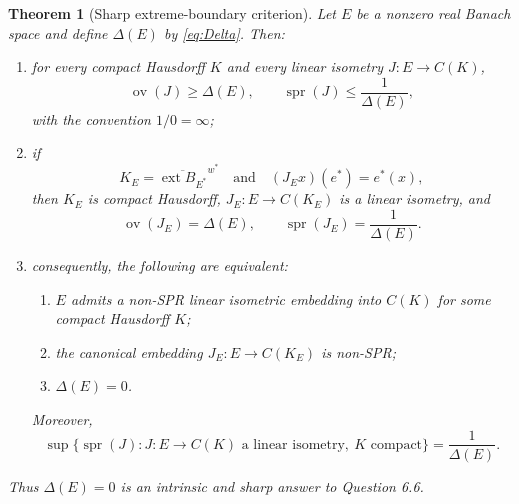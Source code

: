 \documentclass[11pt]{article}
\newtheorem{theorem}{Theorem}
\newcommand{\ext}{\operatorname{ext}}
\newcommand{\spr}{\operatorname{spr}}
\newcommand{\ov}{\operatorname{ov}}
\begin{document}
\begin{theorem}[Sharp extreme-boundary criterion]\label{thm:main}
Let $E$ be a nonzero real Banach space and define $\Delta(E)$ by
\eqref{eq:Delta}.  Then:
\begin{enumerate}[label=\textup{(\roman*)}]
\item for every compact Hausdorff $K$ and every linear isometry
$J:E\to C(K)$,
\[
 \ov(J)\geq\Delta(E),
 \qquad
 \spr(J)\leq\frac{1}{\Delta(E)},
\]
with the convention $1/0=\infty$;
\item if
\[
 K_E=\overline{\ext B_{E^*}}^{w^*}
 \quad\text{and}\quad
 (J_E x)(e^*)=e^*(x),
\]
then $K_E$ is compact Hausdorff, $J_E:E\to C(K_E)$ is a linear isometry,
and
\[
 \ov(J_E)=\Delta(E),
 \qquad
 \spr(J_E)=\frac{1}{\Delta(E)}.
\]
\item consequently, the following are equivalent:
\begin{enumerate}[label=\textup{(\alph*)}]
\item $E$ admits a non-SPR linear isometric embedding into $C(K)$ for some
compact Hausdorff $K$;
\item the canonical embedding $J_E:E\to C(K_E)$ is non-SPR;
\item $\Delta(E)=0$.
\end{enumerate}
Moreover,
\[
 \sup\{\spr(J):J:E\to C(K)\text{ a linear isometry},\ K\text{ compact}\}
 =\frac1{\Delta(E)}.
\]
\end{enumerate}
Thus $\Delta(E)=0$ is an intrinsic and sharp answer to Question 6.6.
\end{theorem}
\end{document}
